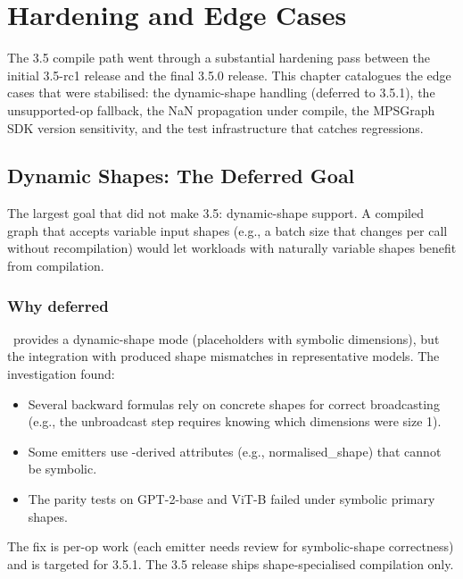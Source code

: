 \chapter{Hardening and Edge Cases}
\label{ch:compile_hardening}

The 3.5 compile path went through a substantial hardening pass
between the initial 3.5-rc1 release and the final 3.5.0 release.
This chapter catalogues the edge cases that were stabilised:
the dynamic-shape handling (deferred to 3.5.1), the
unsupported-op fallback, the NaN propagation under compile, the
MPSGraph SDK version sensitivity, and the test infrastructure
that catches regressions.

\section{Dynamic Shapes: The Deferred Goal}
\label{sec:compile_hardening:dyn_shapes}

The largest goal that did not make 3.5: dynamic-shape support.
A compiled graph that accepts variable input shapes (e.g., a
batch size that changes per call without recompilation) would
let workloads with naturally variable shapes benefit from
compilation.

\subsection{Why deferred}
\label{ssec:compile_hardening:dyn_deferred}

\MPSGraph\ provides a dynamic-shape mode (placeholders with
symbolic dimensions), but the integration with
 produced shape mismatches in
representative models. The investigation found:

\begin{itemize}
  \item Several backward formulas rely on concrete shapes for
    correct broadcasting (e.g., the unbroadcast step requires
    knowing which dimensions were size 1).
  \item Some emitters use -derived attributes
    (e.g.,  normalised\_shape) that cannot be
    symbolic.
  \item The parity tests on GPT-2-base and ViT-B failed under
    symbolic primary shapes.
\end{itemize}

The fix is per-op work (each emitter needs review for
symbolic-shape correctness) and is targeted for 3.5.1. The 3.5
release ships shape-specialised compilation only.

